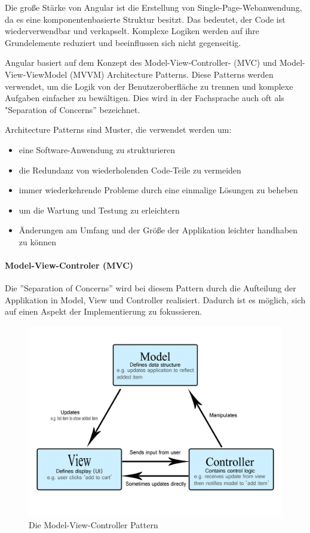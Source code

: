 Die große Stärke von Angular ist die Erstellung von Single-Page-Webanwendung, da es eine komponentenbasierte Struktur besitzt. Das bedeutet, der Code ist wiederverwendbar und verkapselt. Komplexe Logiken werden auf ihre Grundelemente reduziert und beeinflussen sich nicht gegenseitig. \cite{AngularGeneral}

Angular basiert auf dem Konzept des Model-View-Controller- (MVC) und Model-View-ViewModel (MVVM) Architecture Patterns. Diese Patterns werden verwendet, um die Logik von der Benutzeroberfläche zu trennen und komplexe Aufgaben einfacher zu bewältigen. Dies wird in der Fachsprache auch oft als "Separation of Concerns” bezeichnet.
\cite{AngularArchitecturePattern}

Architecture Patterns sind Muster, die verwendet werden um:
\begin{itemize}
  \item eine Software-Anwendung zu strukturieren
  \item die Redundanz von wiederholenden Code-Teile zu vermeiden 
  \item immer wiederkehrende Probleme durch eine einmalige Lösungen zu beheben
  \item um die Wartung und Testung zu erleichtern
  \item Änderungen am Umfang und der Größe der Applikation leichter handhaben zu können
\end{itemize} \cite{MVCmdn, MVVM, MVC}

\paragraph{Model-View-Controler (MVC)}
Die ”Separation of Concerns” wird bei diesem Pattern durch die Aufteilung der Applikation in Model, View und Controller realisiert. Dadurch ist es möglich, sich auf einen Aspekt der Implementierung zu fokussieren. 

\begin{figure} [h t]
  \centering
  \includegraphics[scale=0.5]{pics/mvc.png}
  \caption{Die Model-View-Controller Pattern \cite{MVCmdn}}
  \label{fig:tech:front:mvc-architecture}
\end{figure}

